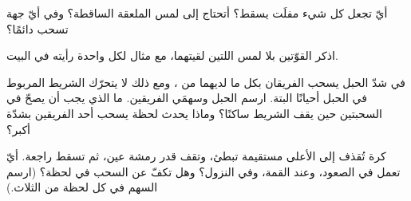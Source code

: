 \begin{exercise}[$\star$]\label{exo:g2:pushes-and-pulls:7}
أيّ  تجعل كل شيء مفلَت يسقط؟ أتحتاج إلى لمس الملعقة الساقطة؟
وفي أيّ جهة تسحب دائمًا؟
\end{exercise}

\begin{exercise}[$\star$]\label{exo:g2:pushes-and-pulls:8}
اذكر القوّتين بلا لمس اللتين لقيتهما، مع مثال لكل واحدة رأيته في
البيت.
\end{exercise}

\begin{exercise}[$\star\star$]\label{exo:g2:pushes-and-pulls:9}
في شدّ الحبل يسحب الفريقان بكل ما لديهما من ، ومع ذلك لا
يتحرّك الشريط المربوط في الحبل أحيانًا البتة. ارسم الحبل وسهمَي
الفريقين. ما الذي يجب أن يصحّ في السحبتين حين يقف الشريط ساكنًا؟
وماذا يحدث لحظة يسحب أحد الفريقين بشدّة أكبر؟
\end{exercise}

\begin{exercise}[$\star\star$]\label{exo:g2:pushes-and-pulls:10}
كرة تُقذف إلى الأعلى مستقيمة تبطئ، وتقف قدر رمشة عين، ثم تسقط
راجعة. أيّ  تعمل في الصعود، وعند القمة، وفي النزول؟ وهل
تكفّ عن السحب في لحظة؟ (ارسم السهم في كل لحظة من الثلاث.)
\end{exercise}
